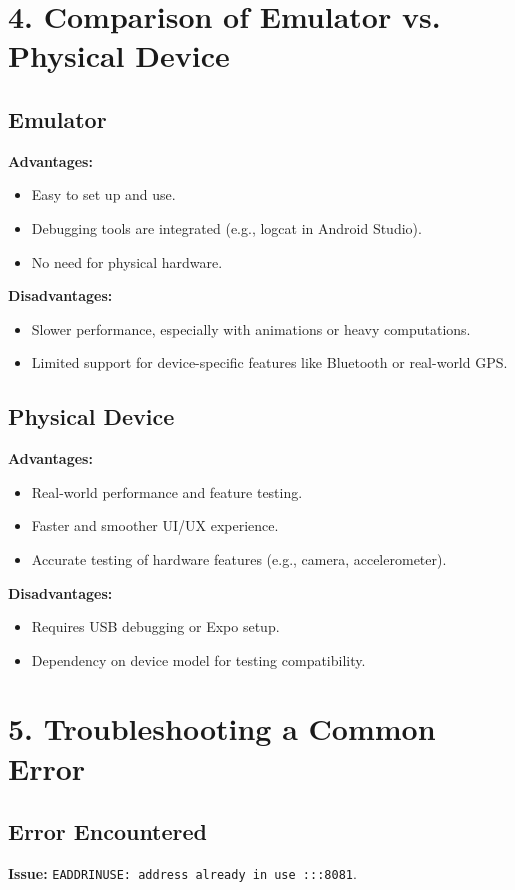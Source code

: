\documentclass[12pt]{article}
\begin{document}
\section*{4. Comparison of Emulator vs. Physical Device}
\subsection*{Emulator}
\textbf{Advantages:}
\begin{itemize}
    \item Easy to set up and use.
    \item Debugging tools are integrated (e.g., logcat in Android Studio).
    \item No need for physical hardware.
\end{itemize}

\textbf{Disadvantages:}
\begin{itemize}
    \item Slower performance, especially with animations or heavy computations.
    \item Limited support for device-specific features like Bluetooth or real-world GPS.
\end{itemize}

\subsection*{Physical Device}
\textbf{Advantages:}
\begin{itemize}
    \item Real-world performance and feature testing.
    \item Faster and smoother UI/UX experience.
    \item Accurate testing of hardware features (e.g., camera, accelerometer).
\end{itemize}

\textbf{Disadvantages:}
\begin{itemize}
    \item Requires USB debugging or Expo setup.
    \item Dependency on device model for testing compatibility.
\end{itemize}

\section*{5. Troubleshooting a Common Error}
\subsection*{Error Encountered}
\textbf{Issue:} \texttt{EADDRINUSE: address already in use :::8081}.
\end{document}
